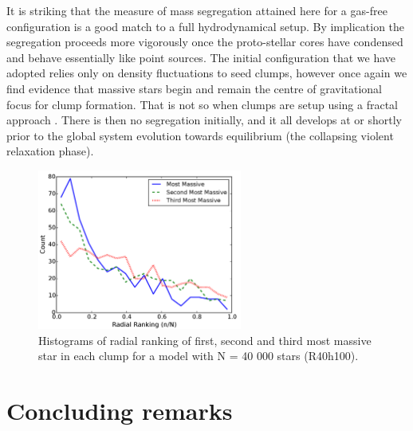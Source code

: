 It is striking that the measure of mass segregation attained here for a gas-free configuration is a good match to a full hydrodynamical setup. By implication the segregation proceeds more vigorously once the proto-stellar cores have condensed and behave essentially like point sources. The initial configuration that we have adopted relies only on density fluctuations to seed clumps, however once again we find evidence that massive stars begin and remain the centre of gravitational focus for clump formation. That is not so when clumps are setup using a fractal approach \citep{Goodwin2004,Allison2009}. There is then no segregation initially, and it all develops at or shortly prior to the global system evolution towards equilibrium (the collapsing violent relaxation phase). 


\begin{figure}
\begin{center}
\includegraphics[width=0.6\textwidth]{Figures/2_ClumpSeg}
\caption{Histograms of radial ranking of first, second and third most massive star in each clump for a model with N = 40 000 stars (R40h100).}
\label{Fig:2_ClumpSeg}
\end{center}
\end{figure}







\section{Concluding remarks}


